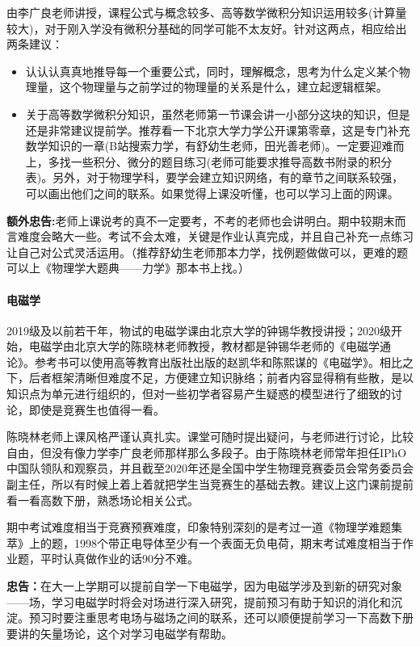 \documentclass[
decoration,  %
]{qyxf-book}
\begin{document}
由李广良老师讲授，课程公式与概念较多、高等数学微积分知识运用较多(计算量较大)，对于刚入学没有微积分基础的同学可能不太友好。针对这两点，相应给出两条建议：
\begin{itemize}
	\item 认认认真真地推导每一个重要公式，同时，理解概念，思考为什么定义某个物理量，这个物理量与之前学过的物理量的关系是什么，建立起逻辑框架。
	\item 关于高等数学微积分知识，虽然老师第一节课会讲一小部分这块的知识，但是还是非常建议提前学。推荐看一下北京大学力学公开课第零章，这是专门补充数学知识的一章(B站搜索力学，有舒幼生老师，田光善老师)。一定要迎难而上，多找一些积分、微分的题目练习(老师可能要求推导高数书附录的积分表)。另外，对于物理学科，要学会建立知识网络，有的章节之间联系较强，可以画出他们之间的联系。如果觉得上课没听懂，也可以学习上面的网课。
\end{itemize}

\textbf{额外忠告:}老师上课说考的真不一定要考，不考的老师也会讲明白。期中较期末而言难度会略大一些。考试不会太难，关键是作业认真完成，并且自己补充一点练习让自己对公式灵活运用。（推荐舒幼生老师那本力学，找例题做做可以，更难的题可以上《物理学大题典——力学》那本书上找。）

\paragraph{电磁学}
2019级及以前若干年，物试的电磁学课由北京大学的钟锡华教授讲授；2020级开始，电磁学由北京大学的陈晓林老师教授，教材都是钟锡华老师的《电磁学通论》。参考书可以使用高等教育出版社出版的赵凯华和陈熙谋的《电磁学》。相比之下，后者框架清晰但难度不足，方便建立知识脉络；前者内容显得稍有些散，是以知识点为单元进行组织的，但对一些初学者容易产生疑惑的模型进行了细致的讨论，即使是竞赛生也值得一看。


陈晓林老师上课风格严谨认真扎实。课堂可随时提出疑问，与老师进行讨论，比较自由，但没有像力学李广良老师那样那么多段子。由于陈晓林老师常年担任IPhO中国队领队和观察员，并且截至2020年还是全国中学生物理竞赛委员会常务委员会副主任，所以有时候上着上着就把学生当竞赛生的基础去教。建议上这门课前提前看一看高数下册，熟悉场论相关公式。


期中考试难度相当于竞赛预赛难度，印象特别深刻的是考过一道《物理学难题集萃》上的题，1998个带正电导体至少有一个表面无负电荷，期末考试难度相当于作业题，平时认真做作业的话90分不难。

\textbf{忠告：}在大一上学期可以提前自学一下电磁学，因为电磁学涉及到新的研究对象——场，学习电磁学时将会对场进行深入研究，提前预习有助于知识的消化和沉淀。预习时要注重思考电场与磁场之间的联系，还可以顺便提前学习一下高数下册要讲的矢量场论，这个对学习电磁学有帮助。
\end{document}
